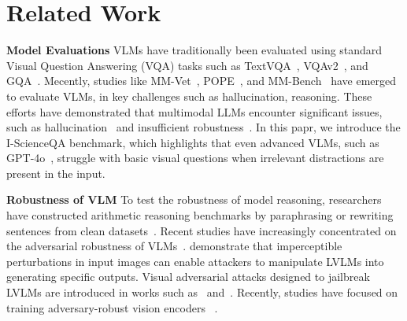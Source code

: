 \section{Related Work}
\label{sec:related_work}

\textbf{Model Evaluations} VLMs have traditionally been evaluated using standard Visual Question Answering (VQA) tasks such as TextVQA~\citep{singh2019towards}, VQAv2~\citep{vqav2}, and GQA~\citep{hudson2019gqa}. Mecently, studies like MM-Vet~\citep{yu2023mm}, POPE~\citep{li2023pope}, and MM-Bench~\citep{liu2023mmbench} have emerged to  evaluate VLMs, in key challenges such as hallucination, reasoning. These efforts have demonstrated that multimodal LLMs encounter significant issues, such as hallucination~\citep{guan2023hallusionbench} and insufficient robustness~\citep{fu2023mme}. In this papr, we introduce the I-ScienceQA benchmark, which highlights that even advanced VLMs, such as GPT-4o~\citep{gpt4v}, struggle with basic visual questions when irrelevant distractions are present in the input. 


\noindent\textbf{Robustness of VLM} To test the robustness of model reasoning, researchers have constructed arithmetic reasoning benchmarks by paraphrasing or rewriting sentences from clean datasets~\citep{patel2021nlp,kumar2021adversarial, shi2023large}.
Recent studies have increasingly concentrated on the adversarial robustness of VLMs~\cite{qi2024visual, carlini2024alignedneuralnetworksadversarially, schlarmann2023adversarial, zhao2023evaluating, dong2023robust}. \citet{schlarmann2023adversarial} demonstrate that imperceptible perturbations in input images can enable attackers to manipulate LVLMs into generating specific outputs. Visual adversarial attacks designed to jailbreak LVLMs are introduced in works such as~\citet{carlini2024alignedneuralnetworksadversarially} and~\citet{qi2024visual}. Recently, studies have focused on training adversary-robust vision encoders ~\cite{schlarmann2024robustclip, mao2023understanding}.